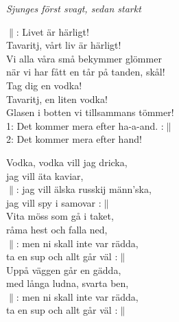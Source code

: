 \documentclass[a6paper, 10pt, twoside]{article}
\begin{document}
\noindent
\begin{center}
    \textit{Sjunges först svagt, sedan starkt}
\end{center}
\begin{lyrics}
$\|$: Livet är härligt!\\
Tavaritj, vårt liv är härligt!\\
Vi alla våra små bekymmer glömmer\\
när vi har fått en tår på tanden, skål!\\
Tag dig en vodka!\\
Tavaritj, en liten vodka!\\
Glasen i botten vi tillsammans tömmer! 
\vspace{5pt}\\
1: Det kommer mera efter ha-a-and. :$\|$
\vspace{5pt}\\
2: Det kommer mera efter hand! 
\end{lyrics}
\begin{center}
\end{center}
\begin{lyrics}
Vodka, vodka vill jag dricka, \\
jag vill äta kaviar, \\
$\|$: jag vill älska russkij männ'ska, \\
jag vill spy i samovar :$\|$
\vspace{5pt}\\
Vita möss som gå i taket, \\
råma hest och falla ned, \\
$\|$: men ni skall inte var rädda, \\
ta en sup och allt går väl :$\|$
\vspace{5pt}\\
Uppå väggen går en gädda, \\
med långa ludna, svarta ben, \\
$\|$: men ni skall inte var rädda, \\
ta en sup och allt går väl :$\|$
\end{lyrics}
\end{document}
